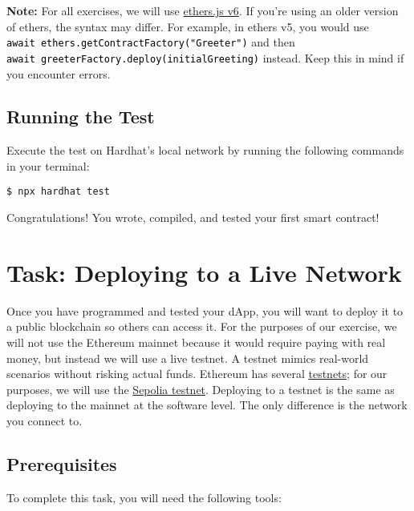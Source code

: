 \documentclass[12pt]{article}
\newcommand{\codegrey}[1]{%
  \texttt{\colorbox{black!4}{\textcolor{black}{#1}}}%
}
\begin{document}
\noindent
\textbf{Note:} For all exercises, we will use \href{https://docs.ethers.org/v6/}{ethers.js v6}. If you're using an older version of ethers, the syntax may differ. For example, in ethers v5, you would use \\ \codegrey{await ethers.getContractFactory("Greeter")} and then \\ \codegrey{await greeterFactory.deploy(initialGreeting)} instead. Keep this in mind if you encounter errors.

\subsection{Running the Test}

Execute the test on Hardhat's local network by running the following commands
in your terminal:

\begin{verbatim}
$ npx hardhat test
\end{verbatim}
Congratulations! You wrote, compiled, and tested your first smart contract!

\section{Task: Deploying to a Live Network}

Once you have programmed and tested your dApp, you will want to deploy it to a
public blockchain so others can access it. For the purposes of our
exercise, we will not use the Ethereum mainnet because it would require paying
with real money, but instead we will use a live testnet. A testnet mimics real-world
scenarios without risking actual funds. Ethereum has several
\href{https://ethereum.org/en/developers/docs/networks/#ethereum-testnets}{testnets};
for our purposes, we will use the \href{https://sepolia.dev/}{Sepolia testnet}. Deploying to a testnet is the same as deploying to the mainnet at the
software level. The only difference is the network you connect to.

\subsection{Prerequisites}

To complete this task, you will need the following tools:
\end{document}
